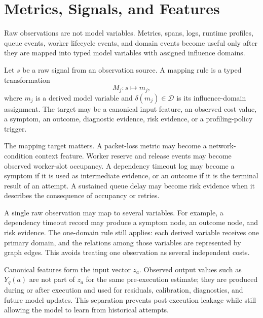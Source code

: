 \section{Metrics, Signals, and Features}
\label{sec:metrics-signals-features}

Raw observations are not model variables. Metrics, spans, logs, runtime
profiles, queue events, worker lifecycle events, and domain events become useful
only after they are mapped into typed model variables with assigned influence
domains.

Let $s$ be a raw signal from an observation source. A mapping rule is a typed
transformation
\[
M_j:s\mapsto m_j,
\]
where $m_j$ is a derived model variable and $\delta(m_j)\in\mathcal{D}$ is its
influence-domain assignment. The target may be a canonical input feature, an
observed cost value, a symptom, an outcome, diagnostic evidence, risk evidence,
or a profiling-policy trigger.

The mapping target matters. A packet-loss metric may become a network-condition
context feature. Worker reserve and release events may become observed
worker-slot occupancy. A dependency timeout log may become a symptom if it is
used as intermediate evidence, or an outcome if it is the terminal result of an
attempt. A sustained queue delay may become risk evidence when it describes the
consequence of occupancy or retries.

A single raw observation may map to several variables. For example, a dependency
timeout record may produce a symptom node, an outcome node, and risk evidence.
The one-domain rule still applies: each derived variable receives one primary
domain, and the relations among those variables are represented by graph edges.
This avoids treating one observation as several independent costs.

Canonical features form the input vector $z_a$. Observed output values such as
$Y_q(a)$ are not part of $z_a$ for the same pre-execution estimate; they are
produced during or after execution and used for residuals, calibration,
diagnostics, and future model updates. This separation prevents post-execution
leakage while still allowing the model to learn from historical attempts.

